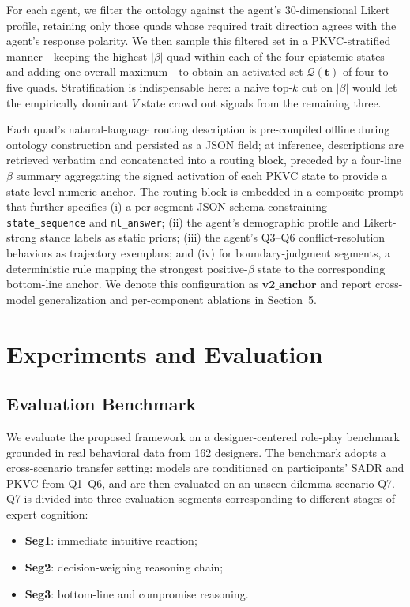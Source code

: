 \documentclass[11pt]{article}
\begin{document}
For each agent, we filter the ontology against the agent's 30-dimensional Likert profile, retaining only those quads whose required trait direction agrees with the agent's response polarity. We then sample this filtered set in a PKVC-stratified manner---keeping the highest-$|\beta|$ quad within each of the four epistemic states and adding one overall maximum---to obtain an activated set $\mathcal{Q}(\mathbf{t})$ of four to five quads. Stratification is indispensable here: a naive top-$k$ cut on $|\beta|$ would let the empirically dominant $V$ state crowd out signals from the remaining three.

Each quad's natural-language routing description is pre-compiled offline during ontology construction and persisted as a JSON field; at inference, descriptions are retrieved verbatim and concatenated into a routing block, preceded by a four-line $\beta$ summary aggregating the signed activation of each PKVC state to provide a state-level numeric anchor. The routing block is embedded in a composite prompt that further specifies (i) a per-segment JSON schema constraining \texttt{state\_sequence} and \texttt{nl\_answer}; (ii) the agent's demographic profile and Likert-strong stance labels as static priors; (iii) the agent's Q3--Q6 conflict-resolution behaviors as trajectory exemplars; and (iv) for boundary-judgment segments, a deterministic rule mapping the strongest positive-$\beta$ state to the corresponding bottom-line anchor. We denote this configuration as $\textbf{v2\_anchor}$ and report cross-model generalization and per-component ablations in Section~5.

\section{Experiments and Evaluation}
\subsection{Evaluation Benchmark}
We evaluate the proposed framework on a designer-centered role-play benchmark grounded in real behavioral data from 162 designers. The benchmark adopts a cross-scenario transfer setting: models are conditioned on participants' SADR and PKVC from Q1--Q6, and are then evaluated on an unseen dilemma scenario Q7. Q7 is divided into three evaluation segments corresponding to different stages of expert cognition:
\begin{itemize}
    \item \textbf{Seg1}: immediate intuitive reaction;
    \item \textbf{Seg2}: decision-weighing reasoning chain;
    \item \textbf{Seg3}: bottom-line and compromise reasoning.
\end{itemize}
\end{document}
